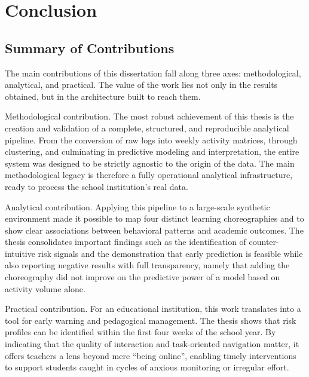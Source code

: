 \chapter{Conclusion}
\label{chap:conclusion}


\section{Summary of Contributions}
\label{sec:contributions}

The main contributions of this dissertation fall along three axes: methodological, analytical, and practical. The value of the work lies not only in the results obtained, but in the architecture built to reach them.

Methodological contribution. The most robust achievement of this thesis is the creation and validation of a complete, structured, and reproducible analytical pipeline. From the conversion of raw logs into weekly activity matrices, through clustering, and culminating in predictive modeling and interpretation, the entire system was designed to be strictly agnostic to the origin of the data. The main methodological legacy is therefore a fully operational analytical infrastructure, ready to process the school institution's real data.

Analytical contribution. Applying this pipeline to a large-scale synthetic environment made it possible to map four distinct learning choreographies and to show clear associations between behavioral patterns and academic outcomes. The thesis consolidates important findings such as the identification of counter-intuitive risk signals and the demonstration that early prediction is feasible while also reporting negative results with full transparency, namely that adding the choreography did not improve on the predictive power of a model based on activity volume alone.

Practical contribution. For an educational institution, this work translates into a tool for early warning and pedagogical management. The thesis shows that risk profiles can be identified within the first four weeks of the school year. By indicating that the quality of interaction and task-oriented navigation matter, it offers teachers a lens beyond mere ``being online'', enabling timely interventions to support students caught in cycles of anxious monitoring or irregular effort.

